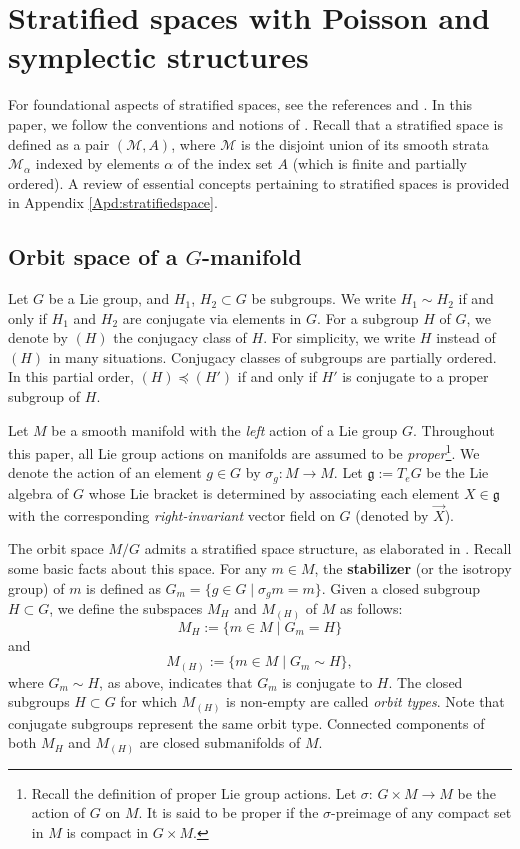 \documentclass[12pt]{amsart}
\theoremstyle{definition}
\numberwithin{equation}{section}
\newcommand{\galgebra}{\mathfrak{g}}
\newcommand{\partialless}{\preccurlyeq}
\begin{document}
	

 
 \section{Stratified spaces with Poisson and symplectic  structures}\label{Sec:stratifiedpoissonsymplectic}  
For foundational aspects of stratified spaces, see the references \cite{Pflaumbook} and \cite{Pflaumpaper}. In this paper, we   follow the conventions and notions of \cite{SLannals}. Recall that a stratified space is defined as a pair $(\mathcal{M}, A)$, where $\mathcal{M}$ is the disjoint union of its smooth strata $\mathcal{M}_{\alpha}$ indexed by elements $\alpha$ of the index set $A$ (which is finite and partially ordered). A review of essential concepts pertaining to stratified spaces is provided in Appendix \ref{Apd:stratifiedspace}.
	
	
	
	\subsection{Orbit space of a $G$-manifold}
	
	
	Let $G$ be a Lie group, and $H_1$, $H_2\subset G$ be subgroups. We write $H_1 \sim H_2$ if and only if   $H_1$ and $H_2$ are conjugate via elements in $G$. For a subgroup $H$ of $G$, we denote by $(H)$ the conjugacy class of $H$. For simplicity,  we write $H$ instead of $(H)$ in many situations. Conjugacy classes of subgroups are partially ordered. In this partial order,   $(H) \partialless (H')$ if and only if $H'$ is conjugate to a proper subgroup of $H$.
	
	
	Let $M$ be a smooth manifold with the \emph{left} action of a Lie group $G$. Throughout this paper, all Lie group actions on manifolds are assumed to be \textit{proper}\footnote{Recall the definition of proper Lie group actions. Let $\sigma$: $G\times M\to M $
		be the action of $G$ on $M$. It   
		is said to be proper if the $\sigma$-preimage of any compact set in $M$ is compact in $G\times M$.}. We denote the action of an element $g \in G$ by $\sigma_g : M \to M$. Let $\galgebra := T_eG$  be the Lie algebra of $G$ whose Lie bracket is determined by associating each element $X \in \galgebra$ with the corresponding \textit{right-invariant} vector field  on $G$ (denoted by $\overrightarrow{X}$).
	
	
	
	The orbit space $M/G$ admits a stratified space structure, as elaborated in \cite{Pflaumpaper}. Recall some basic facts about this space. For any $m \in M$, the  \textbf{stabilizer}  (or the isotropy group) of $m$    is defined as $G_m = \{g \in G \mid \sigma_g m = m\}$. Given a closed subgroup $H \subset G$, we define the subspaces $M_H$ and $M_{(H)}$ of $M$ as follows:
	$$
	M_{H} := \{m \in M \mid G_m = H\}
	$$
	and
	$$
	M_{(H)} := \{m \in M \mid G_m \sim H\},
	$$
	where $G_m \sim H$, as above, indicates that $G_m$ is conjugate to $H$. The closed subgroups $H \subset G$ for which $M_{(H)}$ is non-empty are called  \textit{orbit types}. Note that conjugate subgroups represent the same orbit type. Connected components of both $M_H$ and $M_{(H)}$ are closed submanifolds of $M$.
	
\end{document}
